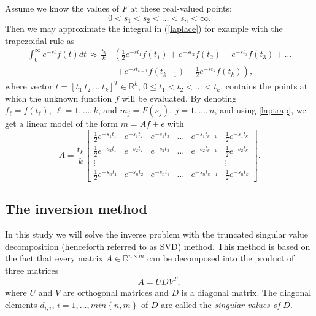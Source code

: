 \documentclass[12pt,a4]{article}
\newcommand{\R}{{\mathbb R}}
\begin{document}
Assume we know the values of $F$ at these real-valued points:
$$
 0<s_1<s_2<\ldots <s_n<\infty.
$$ 
Then we may approximate the integral in (\ref{laplace}) for example with the trapezoidal rule as
\begin{equation} \label{laptrap}
\begin{split}
 \int_0^\infty e^{-st}f(t)dt\, \approx\, \frac{t_k}{k} & \left( \frac{1}{2}e^{-st_1}f(t_1)+e^{-st_2}f(t_2)+e^{-st_3}f(t_3)+\ldots\right.\\   &\ \ \left. +e^{-st_{k-1}}f(t_{k-1})+\frac{1}{2}e^{-st_k}f(t_k)\right) ,
\end{split}
\end{equation}
where vector $t=[t_1\ t_2\ \ldots\ t_k]^T\in\R^k$, $0\leq t_1<t_2<\ldots <t_k$, contains the points at which the unknown function $f$ will be evaluated. By denoting $f_\ell=f(t_\ell), \ \ell=1,\ldots ,k$, and $m_j=F(s_j),\ j=1,\ldots ,n$, and using \eqref{laptrap}, we get a linear model of the form $m=Af+\epsilon$ with
\begin{equation}\label{LaplaceA} 
A = \frac{t_k}{k}\begin{bmatrix} \frac{1}{2}e^{-s_1t_1} & e^{-s_1t_2} & e^{-s_1t_3} & \ldots & e^{-s_1t_{k-1}} & \frac{1}{2}e^{-s_1t_k} \\
                       \frac{1}{2}e^{-s_2t_1} & e^{-s_2t_2} & e^{-s_2t_3} & \ldots & e^{-s_2t_{k-1}} & \frac{1}{2}e^{-s_2t_k} \\
                       \vdots & & & & & \vdots \\
                       \frac{1}{2}e^{-s_nt_1} & e^{-s_nt_2} & e^{-s_nt_3} & \ldots & e^{-s_nt_{k-1}} & \frac{1}{2}e^{-s_nt_k} \end{bmatrix}.
\end{equation}


\subsection{The inversion method}

In this study we will solve the inverse problem with the truncated singular value decomposition (henceforth referred to as SVD) method. This method is based on the fact that every matrix $A \in \R^{n \times m}$ can be decomposed into the product of three matrices
\begin{equation}
A = U D V^T,
\end{equation}
where $U$ and $V$ are orthogonal matrices and $D$ is a diagonal matrix. The diagonal elements $d_{i,i}$, $i = 1, \ldots , min \left\{ n,m \right\}$ of $D$ are called the \emph{singular values of $D$}.
\end{document}
